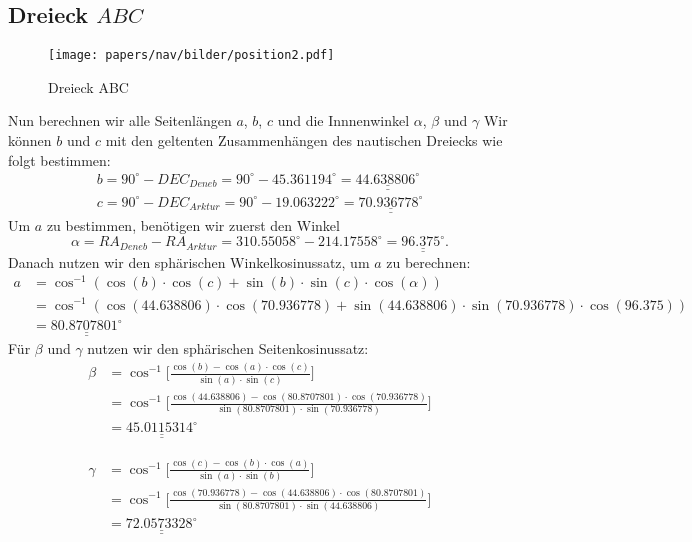 \subsection{Dreieck $ABC$}
\begin{wrapfigure}{R}{5.6cm}
	\texttt{[image: papers/nav/bilder/position2.pdf]}
	\caption{Dreieck ABC}
\end{wrapfigure}
Nun berechnen wir alle Seitenlängen $a$, $b$, $c$ und die Innnenwinkel $\alpha$, $\beta$ und $\gamma$
Wir können $b$ und $c$ mit den geltenten Zusammenhängen des nautischen Dreiecks wie folgt bestimmen:
\begin{align}
	b=90^\circ-DEC_{Deneb} = 90^\circ - 45.361194^\circ = \underline{\underline{44.638806^\circ}}\nonumber \\
	c=90^\circ-DEC_{Arktur} = 90^\circ - 19.063222^\circ = \underline{\underline{70.936778^\circ}} \nonumber 
\end{align}
Um $a$ zu bestimmen, benötigen wir zuerst den Winkel \[\alpha= RA_{Deneb} - RA_{Arktur} = 310.55058^\circ -214.17558^\circ = \underline{\underline{96.375^\circ}}.\]
Danach nutzen wir den sphärischen Winkelkosinussatz, um  $a$ zu berechnen:
\begin{align}
	a &= \cos^{-1}(\cos(b) \cdot \cos(c) + \sin(b) \cdot \sin(c) \cdot \cos(\alpha)) \nonumber \\
	 &= \cos^{-1}(\cos(44.638806) \cdot \cos(70.936778) + \sin(44.638806) \cdot \sin(70.936778) \cdot \cos(96.375)) \nonumber \\
	 &= \underline{\underline{80.8707801^\circ}} \nonumber
\end{align}
Für $\beta$ und $\gamma$ nutzen wir den sphärischen Seitenkosinussatz:
\begin{align}
	\beta &= \cos^{-1}  \bigg[\frac{\cos(b)-\cos(a) \cdot \cos(c)}{\sin(a) \cdot \sin(c)}\bigg] \nonumber \\
	&= \cos^{-1}  \bigg[\frac{\cos(44.638806)-\cos(80.8707801) \cdot \cos(70.936778)}{\sin(80.8707801) \cdot \sin(70.936778)}\bigg] \nonumber \\
	&= \underline{\underline{45.0115314^\circ}} \nonumber
\end{align}

	\begin{align}
	\gamma &=  \cos^{-1}  \bigg[\frac{\cos(c)-\cos(b) \cdot \cos(a)}{\sin(a) \cdot \sin(b)}\bigg] \nonumber \\
	&=  \cos^{-1}  \bigg[\frac{\cos(70.936778)-\cos(44.638806) \cdot \cos(80.8707801)}{\sin(80.8707801) \cdot \sin(44.638806)}\bigg] \nonumber \\
	&=\underline{\underline{72.0573328^\circ}} \nonumber
\end{align}
